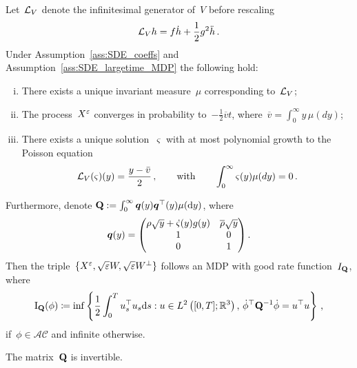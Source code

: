 \begin{theorem}\label{thm:limitPoisson}
Let~$\mathcal{L}_{V}$ denote the infinitesimal generator of~$V$ before rescaling
\[
\mathcal{L}_V h = f\dot{h} + \frac{1}{2}g^2\ddot{h}\,.
\]
Under Assumption~\ref{ass:SDE_coeffs} and Assumption~\ref{ass:SDE_largetime_MDP} the following hold:
\begin{enumerate}[i)]
    \item There exists a unique invariant measure~$\mu$ corresponding to~$\mathcal{L}_V$;
    \item The process~$X^{\varepsilon}$ converges in probability to~$-\frac{1}{2}\overline{v}t$, where~$\overline{v} = \int_0^\infty y \, \mu(dy)$;
    \item There exists a unique solution~$\varsigma$ with at most polynomial growth to the Poisson equation
    \[
    \mathcal{L}_V(\varsigma)(y) = \frac{y - \bar{v}}{2}\,, 
    \qquad \text{with} \qquad \int_0^\infty \varsigma(y)\mu(dy)=0\,.
    \]
\end{enumerate}
Furthermore, denote 
$\boldsymbol{\mathrm{Q}}:=\int_0^\infty\boldsymbol{q}(y)\boldsymbol{q}^\top(y)\mu(\mathrm{d} y)$, where
$$
\boldsymbol{q}(y) =
\begin{pmatrix}
\rho\sqrt{y} + \dot{\varsigma}(y)g(y) & \overline{\rho}\sqrt{y}\\
1 & 0 \\
0 & 1 \\
\end{pmatrix}.
$$
Then the triple~$\{X^{\varepsilon},\sqrt{\varepsilon}W,\sqrt{\varepsilon}W^{\perp}\}$ follows an MDP with good rate function~$I_{\boldsymbol{\mathrm{Q}}}$,
where
$$
\mathrm{I}_{\boldsymbol{\mathrm{Q}}}(\phi) \coloneqq 
\inf \left\{\frac{1}{2}\int_0^T u_s^\top u_s\mathrm{d} s: u\in L^2\left([0,T]; \mathbb{R}^3\right), \, \dot{\phi}^\top \boldsymbol{\mathrm{Q}}^{-1} \dot{\phi} = u^\top u \right\}\,,
$$
if~$\phi\in\mathcal{AC}$ and infinite otherwise.
\end{theorem}
\begin{lemma}\label{q-invertible}
The matrix~$\boldsymbol{\mathrm{Q}}$ is invertible. 
\end{lemma}

